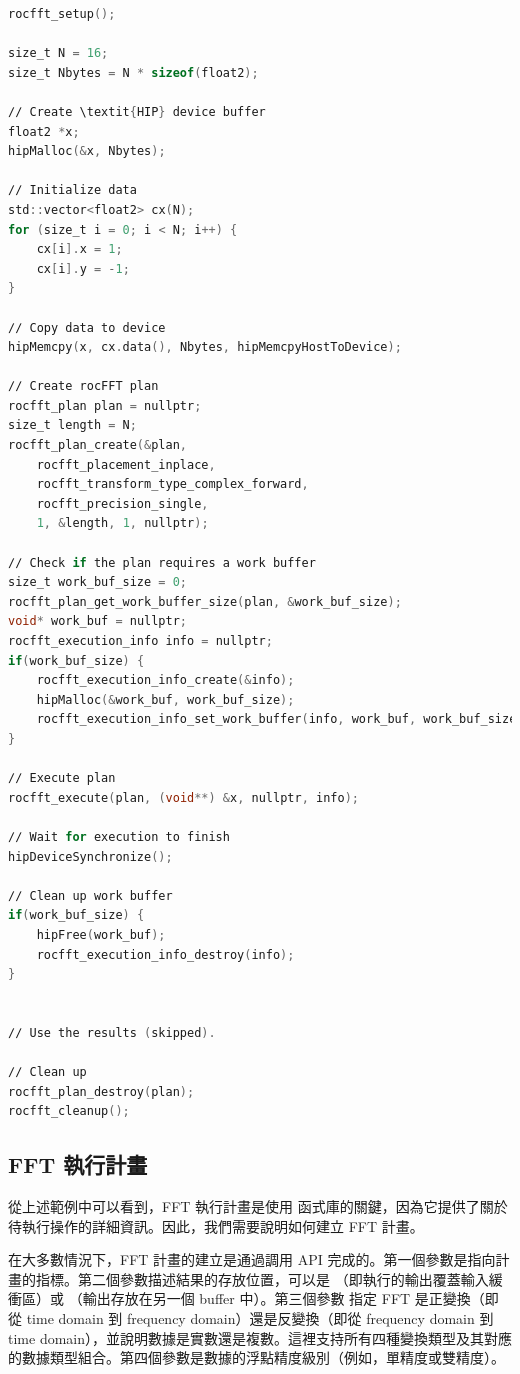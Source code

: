\begin{lstlisting}[language=C, caption={使用 \term{rocFFT} 函式庫的範例。}, captionpos=t, label={lst:rocFFT}]
rocfft_setup();

size_t N = 16;
size_t Nbytes = N * sizeof(float2);

∕∕ Create \textit{HIP} device buffer
float2 *x;
hipMalloc(&x, Nbytes);

∕∕ Initialize data
std::vector<float2> cx(N);
for (size_t i = 0; i < N; i++) {
    cx[i].x = 1;
    cx[i].y = -1;
}

∕∕ Copy data to device
hipMemcpy(x, cx.data(), Nbytes, hipMemcpyHostToDevice);

∕∕ Create rocFFT plan
rocfft_plan plan = nullptr;
size_t length = N;
rocfft_plan_create(&plan,
    rocfft_placement_inplace,
    rocfft_transform_type_complex_forward,
    rocfft_precision_single,
    1, &length, 1, nullptr);

∕∕ Check if the plan requires a work buffer
size_t work_buf_size = 0;
rocfft_plan_get_work_buffer_size(plan, &work_buf_size);
void* work_buf = nullptr;
rocfft_execution_info info = nullptr;
if(work_buf_size) {
    rocfft_execution_info_create(&info);
    hipMalloc(&work_buf, work_buf_size);
    rocfft_execution_info_set_work_buffer(info, work_buf, work_buf_size);
}

∕∕ Execute plan
rocfft_execute(plan, (void**) &x, nullptr, info);

∕∕ Wait for execution to finish
hipDeviceSynchronize();

∕∕ Clean up work buffer
if(work_buf_size) {
    hipFree(work_buf);
    rocfft_execution_info_destroy(info);
}


∕∕ Use the results (skipped).

∕∕ Clean up
rocfft_plan_destroy(plan);
rocfft_cleanup();
\end{lstlisting}

\subsection{FFT 執行計畫}
從上述範例中可以看到，FFT 執行計畫是使用  函式庫的關鍵，因為它提供了關於待執行操作的詳細資訊。因此，我們需要說明如何建立 FFT 計畫。

在大多數情況下，FFT 計畫的建立是通過調用  API 完成的。第一個參數是指向計畫的指標。第二個參數描述結果的存放位置，可以是 （即執行的輸出覆蓋輸入緩衝區）或 （輸出存放在另一個 buffer 中）。第三個參數  指定 FFT 是正變換（即從 time domain 到 frequency domain）還是反變換（即從 frequency domain  到 time domain），並說明數據是實數還是複數。這裡支持所有四種變換類型及其對應的數據類型組合。第四個參數是數據的浮點精度級別（例如，單精度或雙精度）。

